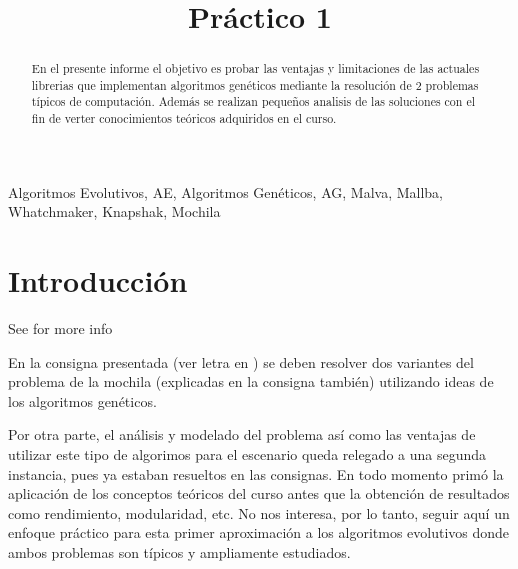 \documentclass[9pt,conference]{IEEEtran}
\begin{document}
	\title{Pr\'actico 1}
	\author{
		\and
	}



	\maketitle

	\begin{abstract}
	En el presente informe el objetivo es probar las ventajas y limitaciones de las actuales librerias que implementan algoritmos genéticos mediante la resolución de 2 problemas típicos de computación. Además se realizan pequeños analisis de las soluciones con el fin de verter conocimientos teóricos adquiridos en el curso.
	\end{abstract}
	\begin{IEEEkeywords}
	Algoritmos Evolutivos, AE, Algoritmos Genéticos, AG, Malva, Mallba, Whatchmaker, Knapshak, Mochila
	\end{IEEEkeywords}

	\section{Introducci\'on}
	See \cite{refmallba} for more info

	En la consigna presentada (ver letra en \cite{refmallba}) se deben resolver dos variantes del problema de la mochila (explicadas en la consigna también) utilizando ideas de los algoritmos genéticos.

	Por otra parte, el análisis y modelado del problema así como las ventajas de utilizar este tipo de algorimos para el escenario queda relegado a una segunda instancia, pues ya estaban resueltos en las consignas. En todo momento primó la aplicación de los conceptos teóricos del curso antes que la obtención de resultados como rendimiento, modularidad, etc. No nos interesa, por lo tanto, seguir aquí un enfoque práctico para esta primer aproximación a los algoritmos evolutivos donde ambos problemas son típicos y ampliamente estudiados.
\end{document}
